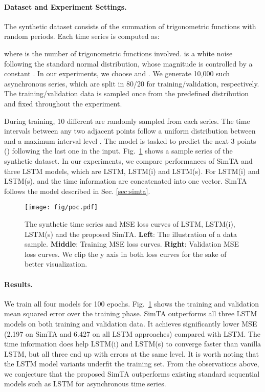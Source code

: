 \documentclass[runningheads]{llncs}
\begin{document}
	\paragraph{\textbf{Dataset and Experiment Settings.}}
	The synthetic dataset consists of the summation of  trigonometric functions with random periods. Each time series is computed as:
	
	where  is the number of trigonometric functions involved.  is a white noise following the standard normal distribution, whose magnitude is controlled by a constant . In our experiments, we choose  and . We generate 10,000 such asynchronous series, which are split in 80/20 for training/validation, respectively. The training/validation data is sampled once from the predefined distribution and fixed throughout the experiment.
	
	During training, 10 different  are randomly sampled from each series. The time intervals between any two adjacent points follow a uniform distribution between  and a maximum interval level . The model is tasked to predict the next 3 points () following the last one in the input. Fig.~\ref{fig:poc} shows a sample series of the synthetic dataset.
	In our experiments, we compare performances of SimTA and three LSTM models, which are LSTM, LSTM(i) and LSTM(s). For LSTM(i) and LSTM(s),  and the time information are concatenated into one vector.  SimTA follows the model described in Sec. \ref{sec:simta}.

	\begin{figure}[tb]
	\texttt{[image: fig/poc.pdf]}
	\caption{The synthetic time series and MSE loss curves of LSTM, LSTM(i), LSTM(s) and the proposed SimTA. \textbf{Left}: The illustration of a data sample. \textbf{Middle}: Training MSE loss curves. \textbf{Right}: Validation MSE loss curves. We clip the y axis in both loss curves for the sake of better visualization.} \label{fig:poc}

	\end{figure}

	\paragraph{\textbf{Results.}}
	We train all four models for 100 epochs. Fig.~\ref{fig:poc} shows the training and validation mean squared error over the training phase. SimTA outperforms all three LSTM models on both training and validation data. It achieves significantly lower MSE (2.197 on SimTA and 6.427 on all LSTM approaches) compared with LSTM. The time information does help LSTM(i) and LSTM(s) to converge faster than vanilla LSTM, but all three end up with errors at the same level. It is worth noting that the LSTM model variants underfit the training set. From the observations above, we conjecture that the proposed SimTA outperforms existing standard sequential models such as LSTM for asynchronous time series.
\end{document}
